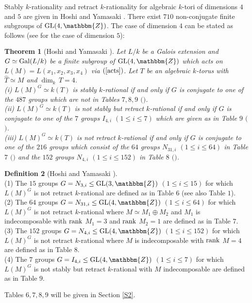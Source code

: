 \documentclass{amsart}
\theoremstyle{plain}
\newtheorem{theorem}{Theorem}[section]
\theoremstyle{definition}
\newtheorem{definition}[theorem]{Definition}
\theoremstyle{remark}
\newcommand{\bZ}{\mathbbm{Z}}\newcommand{\bQ}{\mathbbm{Q}}
\newcommand{\GL}{{\rm GL}}\newcommand{\SL}{{\rm SL}}
\newcounter{sub}\def\tr{\mbox{tr }}
\begin{document}
Stably $k$-rationality and retract $k$-rationality 
for algebraic $k$-tori of dimensions $4$ and $5$ 
are given in Hoshi and Yamasaki \cite[Chapter 1]{HY17}.   
There exist $710$ non-conjugate finite subgroups of $\GL(4,\bZ)$. 
The case of dimension $4$ can be stated as follows 
(see \cite[Theorem 1.12]{HY17} for the case of dimension $5$): 
%
\begin{theorem}[Hoshi and Yamasaki {\cite[Theorem 1.9]{HY17}}]\label{thHY17}
Let $L/k$ be a Galois extension and $G\simeq 
{\rm Gal}(L/k)$ be a finite subgroup of $\GL(4,\bZ)$ 
which acts on $L(M)=L(x_1,x_2,x_3,x_4)$ via $(\ref{acts})$. 
Let $T$ be an algebraic $k$-torus with $\widehat{T}\simeq M$ 
and $\dim_k\, T=4$.\\
{\rm (i)} 
$L(M)^G\simeq k(T)$ is stably $k$-rational 
if and only if 
$G$ is conjugate to one of the $487$ groups which are not in 
{\rm Tables} $7, 8, 9$ 
$($\cite[{\rm Tables} $2$, $3$, $4$]{HY17}$)$.\\
{\rm (ii)} 
$L(M)^G\simeq k(T)$ is not stably but retract $k$-rational 
if and only if $G$ is conjugate to one of the $7$ groups $I_{4,i}$ 
$(1\leq i\leq 7)$ 
which are given as in {\rm Table} $9$ $($\cite[{\rm Table} $2$]{HY17}$)$.\\
{\rm (iii)} 
$L(M)^G\simeq k(T)$ is not retract $k$-rational if and only if 
$G$ is conjugate to one of the $216$ groups which consist of 
the $64$ groups $N_{31,i}$ $(1\leq i\leq 64)$ 
in {\rm Table} $7$ $($\cite[{\rm Table} $3$]{HY17}$)$
and 
the $152$ groups $N_{4,i}$ $(1\leq i\leq 152)$ 
in {\rm Table} $8$ $($\cite[{\rm Table} $4$]{HY17}$)$. 
\end{theorem}

\begin{definition}[Hoshi and Yamasaki {\cite[Table $2$, Table $3$, Table $4$, Example 4.12]{HY17}}]\label{defN3N4}
~\\
(1) The $15$ groups $G=N_{3,i}\leq \GL(3,\bZ)$ $(1\leq i\leq 15)$ 
for which $L(M)^G$ is not retract $k$-rational 
are defined as in Table $6$ (see also Table $1$). \\
(2) The $64$ groups 
$G=N_{31,i}\leq \GL(4,\bZ)$ $(1\leq i\leq 64)$ 
for which $L(M)^G$ is not retract $k$-rational 
where $M\simeq M_1\oplus M_2$ and $M_1$ is indecomposable 
with ${\rm rank}$ $M_1=3$ 
and ${\rm rank}$ $M_2=1$ are defined as in Table $7$.\\
(3) The $152$ groups $G=N_{4,i}\leq \GL(4,\bZ)$ $(1\leq i\leq 152)$ 
for which $L(M)^G$ is not retract $k$-rational 
where $M$ is indecomposable with ${\rm rank}$ $M=4$ 
are defined as in Table $8$.\\
(4) The $7$ groups $G=I_{4,i}\leq \GL(4,\bZ)$ $(1\leq i\leq 7)$
for which $L(M)^G$ is not stably but retract $k$-rational 
with $M$ indecomposable are defined as in Table $9$.
\end{definition}
Tables $6,7,8,9$ will be given in Section \ref{S2}.
\end{document}
